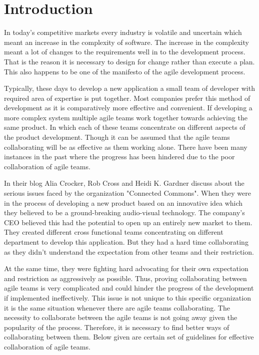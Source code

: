 \documentclass[sigconf]{acmart}
\begin{document}
\section{Introduction}
In today's competitive markets every industry is volatile and uncertain which meant an increase in the complexity of software. The increase in the complexity meant a lot of changes to the requirements well in to the development process. That is the reason it is necessary to design for change rather than execute a plan. This also happens to be one of the manifesto of the agile development process. 

Typically, these days to develop a new application a small team of developer with required area of expertise is put together. Most companies prefer this method of development as it is comparatively more effective and convenient. If developing a more complex system multiple agile teams work together towards achieving the same product. In which each of these teams concentrate on different aspects of the product development. Though it can be assumed that the agile teams collaborating will be as effective as them working alone. There have been many instances in the past where the progress has been hindered due to the poor collaboration of agile teams.

In their blog \cite{Alia01} Alia Crocker, Rob Cross and Heidi K. Gardner discuss about the serious issues faced by the organization "Connected Commons". When they were in the process of developing a new product based on an innovative idea which they believed to be a ground-breaking audio-visual technology. The company's CEO believed this had the potential to open up an entirely new market to them. They created different cross functional teams concentrating on different department to develop this application. But they had a hard time collaborating as they didn't understand the expectation from other teams and their restriction. 

At the same time, they were fighting hard advocating for their own expectation and restriction as aggressively as possible. Thus, proving collaborating between agile teams is very complicated and could hinder the progress of the development if implemented ineffectively. This issue is not unique to this specific organization it is the same situation whenever there are agile teams collaborating. The necessity to collaborate between the agile teams is not going away given the popularity of the process. Therefore, it is necessary to find better ways of collaborating between them. Below given are certain set of guidelines for effective collaboration of agile teams.
\end{document}
